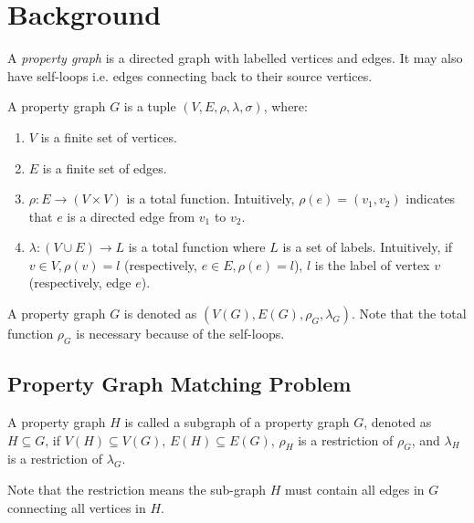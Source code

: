 \section{Background}\label{sec:background}
A \emph{property graph} is a directed graph with labelled vertices and edges. It may also have self-loops i.e. edges connecting back to their source vertices.

\begin{definition}
  A property graph $G$ is a tuple $(V, E, \rho, \lambda, \sigma)$, where:
  \begin{enumerate}[noitemsep,label={(\arabic*)}]
  \item $V$ is a finite set of vertices.
  \item $E$ is a finite set of edges.
  \item $\rho: E \rightarrow (V \times V)$ is a total function.
    Intuitively, $\rho(e) = (v_1, v_2)$ indicates that $e$ is a directed edge from $v_1$ to $v_2$.
  \item $\lambda :(V \cup E) \rightarrow L$ is a total function where $L$ is a set of labels.
    Intuitively, if $v \in V, \rho(v) = l$ (respectively, $e \in E, \rho(e) = l$),
    $l$ is the label of vertex $v$ (respectively, edge $e$).
  \end{enumerate}
\end{definition}
A property graph $G$ is denoted as $(V(G), E(G), \rho_G, \lambda_G)$.
Note that the total function $\rho_G$ is necessary because of the self-loops.
\subsection{Property Graph Matching Problem}
\begin{definition}[Subgraph]
  A property graph $H$ is called a subgraph of a property graph $G$, denoted as $H \subseteq G$, if
  $V(H) \subseteq V(G)$, $E(H) \subseteq E(G)$, $\rho_H$ is a restriction of $\rho_G$, and $\lambda_H$ is a restriction of $\lambda_G$.
\end{definition}
Note that the restriction means the sub-graph $H$ must contain all edges in $G$ connecting all vertices in $H$.

